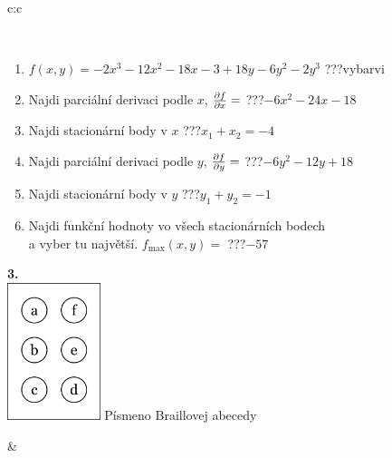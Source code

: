 \documentclass[10pt]{report}
\begin{document}
\begin{tabular}{c:c}
\begin{minipage}[c][104.5mm][t]{0.5\linewidth}
\begin{center}
\begin{minipage}{0.95\linewidth}
\begin{center}
\end{center}
\end{minipage}
\\[1mm]
\begin{minipage}{0.79\linewidth}
\begin{center}
\begin{varwidth}{\linewidth}
\begin{enumerate}
\normalsize
\item $f(x,y)=-2x^3-12x^2-18x-3+18y-6y^2-2y^3$\quad \dotfill\; ???\;\dotfill \quad vybarvi
\item Najdi parciální derivaci podle $x$, $\pdv{f}{x}=$\quad \dotfill\; ???\;\dotfill \quad $-6x^2-24x-18$
\item Najdi stacionární body v $x$\quad \dotfill\; ???\;\dotfill \quad $x_1+x_2=-4$
\item Najdi parciální derivaci podle $y$, $\pdv{f}{y}=$\quad \dotfill\; ???\;\dotfill \quad $-6y^2-12y+18$
\item Najdi stacionární body v $y$\quad \dotfill\; ???\;\dotfill \quad $y_1+y_2=-1$
\item Najdi funkční hodnoty vo všech stacionárních bodech \\ \phantom{xxxxxx} a vyber tu najvětší. $f_{\text{max}}(x,y)=$\quad \dotfill\; ???\;\dotfill \quad $-57$
\end{enumerate}
\end{varwidth}
\end{center}
\end{minipage}
\begin{minipage}{0.20\linewidth}
\begin{center}
{\Huge\bfseries 3.} \\[2mm]
\includegraphics[height=40mm]{../images/braille.png}
{\small Písmeno Braillovej abecedy}
\end{center}
\end{minipage}
\end{center}
\end{minipage}
&
\begin{minipage}[c][104.5mm][t]{0.5\linewidth}
\begin{center}

\end{center}
\end{minipage}
\end{tabular}
\end{document}
